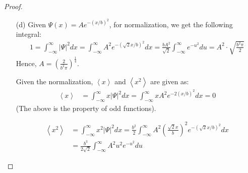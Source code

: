 \documentclass{article}
\begin{document}
\begin{proof}
\begin{itemize}
        \item[(d)] Given $\Psi(x)=Ae^{-(x/b)^2}$, for normalization, we get the following integral:
        \begin{align}
            1=\int_{-\infty}^{\infty}|\Psi|^2dx = \int_{-\infty}^{\infty}A^2e^{-(\sqrt{2}x/b)^2}dx = \frac{bA^2}{\sqrt{2}}\int_{-\infty}^{\infty}e^{-u^2}du = A^2\cdot \sqrt{\frac{b^2\pi}{2}}
        \end{align}
        Hence, $A=\left(\frac{2}{b^2\pi}\right)^\frac{1}{4}$.

        \hfil

        Given the normalization, $\left<x\right>$ and $\left<x^2\right>$ are given as:
        \begin{align}
            \left<x\right>&=\int_{-\infty}^{\infty}x|\Psi|^2dx = \int_{-\infty}^{\infty}xA^2e^{-2(x/b)^2}dx = 0
        \end{align}
        (The above is the property of odd functions).

        \begin{align}
            \left<x^2\right>&=\int_{-\infty}^{\infty}x^2|\Psi|^2dx = \frac{b^2}{2}\int_{-\infty}^{\infty}A^2\left(\frac{\sqrt{2}x}{b}\right)^2e^{-(\sqrt{2}x/b)^2}dx\\
            &= \frac{b^3}{2\sqrt{2}}\int_{-\infty}^{\infty}A^2 u^2e^{-u^2}du
        \end{align}
    \end{itemize}
\end{proof}

\newpage
\end{document}
